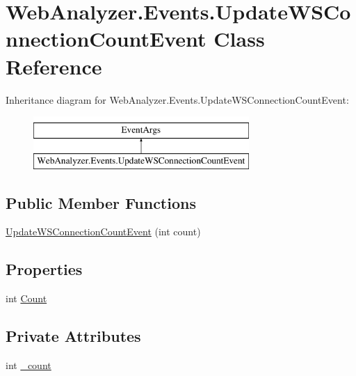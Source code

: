 \hypertarget{class_web_analyzer_1_1_events_1_1_update_w_s_connection_count_event}{}\section{Web\+Analyzer.\+Events.\+Update\+W\+S\+Connection\+Count\+Event Class Reference}
\label{class_web_analyzer_1_1_events_1_1_update_w_s_connection_count_event}
Inheritance diagram for Web\+Analyzer.\+Events.\+Update\+W\+S\+Connection\+Count\+Event\+:\begin{figure}[H]
\begin{center}
\leavevmode
\includegraphics[height=2.000000cm]{class_web_analyzer_1_1_events_1_1_update_w_s_connection_count_event}
\end{center}
\end{figure}
\subsection*{Public Member Functions}
\begin{DoxyCompactItemize}
\item 
\hyperlink{class_web_analyzer_1_1_events_1_1_update_w_s_connection_count_event_afd006af18ad05c117339a6350e772640}{Update\+W\+S\+Connection\+Count\+Event} (int count)
\end{DoxyCompactItemize}
\subsection*{Properties}
\begin{DoxyCompactItemize}
\item 
int \hyperlink{class_web_analyzer_1_1_events_1_1_update_w_s_connection_count_event_acb56db24868f14519a9bb0781413a337}{Count}
\end{DoxyCompactItemize}
\subsection*{Private Attributes}
\begin{DoxyCompactItemize}
\item 
int \hyperlink{class_web_analyzer_1_1_events_1_1_update_w_s_connection_count_event_a8a23f51bfc9370c1d7b56b4fbe2fedb1}{\+\_\+count}
\end{DoxyCompactItemize}



